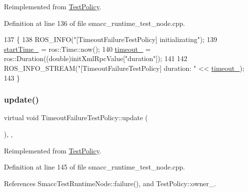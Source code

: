 Reimplemented from \hyperlink{classTestPolicy_a43d28339f108860503ef66ce4692596d}{Test\+Policy}.



Definition at line 136 of file smacc\+\_\+runtime\+\_\+test\+\_\+node.\+cpp.


\begin{DoxyCode}
137   \{
138     ROS\_INFO(\textcolor{stringliteral}{"[TimeoutFailureTestPolicy] initializating"});
139     \hyperlink{classTimeoutFailureTestPolicy_a75bf7a1990099ecd02017c06f3694e64}{startTime\_} = ros::Time::now();
140     \hyperlink{classTimeoutFailureTestPolicy_a6075c28b35a0e10632a2f461d7f7b63a}{timeout\_} = ros::Duration((\textcolor{keywordtype}{double})initXmlRpcValue[\textcolor{stringliteral}{"duration"}]);
141 
142     ROS\_INFO\_STREAM(\textcolor{stringliteral}{"[TimeoutFailureTestPolicy] duration: "} << \hyperlink{classTimeoutFailureTestPolicy_a6075c28b35a0e10632a2f461d7f7b63a}{timeout\_});
143   \}
\end{DoxyCode}
\mbox{\label{classTimeoutFailureTestPolicy_a51946c46616697b0b0d9d7c7aaef9f22}} 
\subsubsection{\texorpdfstring{update()}{update()}}
{\footnotesize\ttfamily virtual void Timeout\+Failure\+Test\+Policy\+::update (\begin{DoxyParamCaption}{ }\end{DoxyParamCaption})\hspace{0.3cm}{\ttfamily [inline]}, {\ttfamily [private]}, {\ttfamily [virtual]}}



Reimplemented from \hyperlink{classTestPolicy_ae7a8f2ef3c4d513122ad20d5cffc88db}{Test\+Policy}.



Definition at line 145 of file smacc\+\_\+runtime\+\_\+test\+\_\+node.\+cpp.



References Smacc\+Test\+Runtime\+Node\+::failure(), and Test\+Policy\+::owner\+\_\+.


